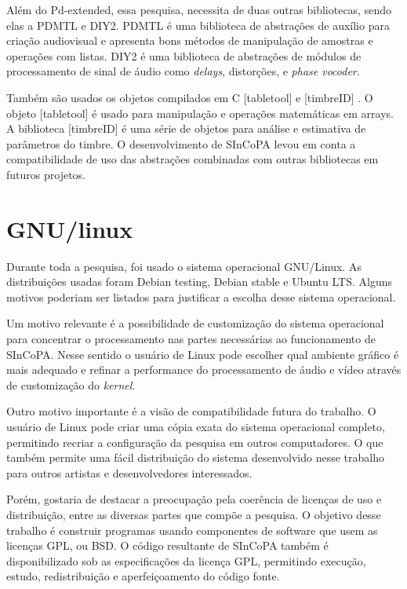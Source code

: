 \documentclass{ppgmus}
\begin{document}
Além do Pd-extended, essa pesquisa, necessita de duas outras bibliotecas, sendo elas a PDMTL e DIY2.
PDMTL é uma biblioteca de abstrações de auxílio para criação audiovisual e apresenta
bons métodos de manipulação de amostras e operações com listas. DIY2 é uma biblioteca de 
abstrações de módulos de processamento de sinal de áudio como \textit{delays}, distorções, e \textit{phase vocoder}.

Também são usados os objetos compilados em C [tabletool] e [timbreID] \cite{brent}. 
O objeto [tabletool] é usado para manipulação e operações matemáticas em arrays.
 A biblioteca [timbreID] é uma série de objetos para análise e estimativa de parâmetros do timbre.
O desenvolvimento de SInCoPA levou em conta a compatibilidade de uso das abstrações combinadas
com outras bibliotecas em futuros projetos.


\section{GNU/linux}

Durante toda a pesquisa, foi usado o sistema operacional GNU/Linux.
As distribuições usadas foram Debian testing, Debian stable e Ubuntu LTS.
Alguns motivos poderiam ser listados para justificar a escolha desse sistema
operacional. 

Um motivo relevante é a possibilidade de customização do sistema operacional para concentrar o 
processamento nas partes necessárias
ao funcionamento de SInCoPA. Nesse sentido o usuário de Linux pode escolher qual ambiente gráfico
é mais adequado e refinar a performance do processamento de áudio e vídeo através de customização
do \textit{kernel}.

Outro motivo importante é a visão de compatibilidade futura do trabalho. 
O usuário de Linux pode criar uma cópia exata do sistema operacional completo, permitindo
recriar a configuração da pesquisa em outros computadores. O que também
permite uma fácil distribuição do sistema desenvolvido nesse trabalho
para outros artistas e desenvolvedores interessados.


Porém, gostaria de destacar a preocupação pela coerência de licenças
de uso e distribuição, entre as diversas partes que compõe a pesquisa.
O objetivo desse trabalho é construir programas usando componentes de software que usem as licenças GPL, ou 
BSD. O código resultante de SInCoPA também é disponibilizado sob as especificações
da licença GPL, permitindo execução, estudo, redistribuição e aperfeiçoamento do código fonte.
\end{document}
